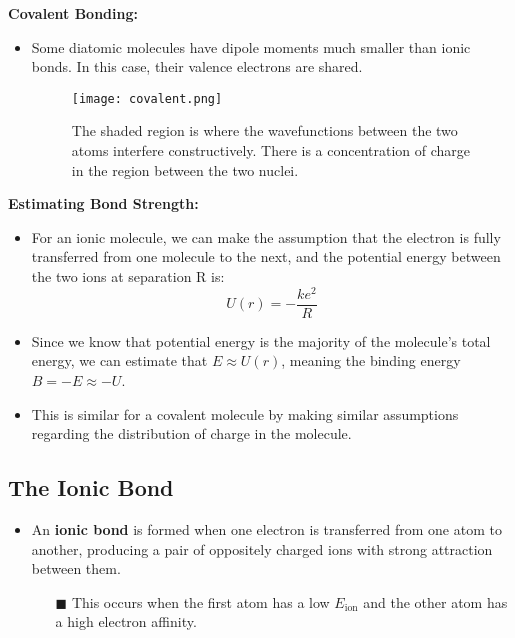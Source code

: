 \documentclass[12pt, letterpaper, twoside]{article}
\begin{document}
\textbf{Covalent Bonding:}

\begin{itemize}
    \item Some diatomic molecules have dipole moments much smaller than ionic bonds. In this case, their valence electrons are shared.
    \begin{figure}[!ht]
        \centering
        \texttt{[image: covalent.png]}
        \caption{The shaded region is where the wavefunctions between the two atoms interfere constructively. There is a concentration of charge in the region between the two nuclei.}
        \label{fig:my_label}
    \end{figure}
\end{itemize}

\textbf{Estimating Bond Strength:}

\begin{itemize}
    \item For an ionic molecule, we can make the assumption that the electron is fully transferred from one molecule to the next, and the potential energy between the two ions at separation R is:
    \begin{equation*}
        U(r) = -\frac{ke^2}{R}
    \end{equation*}
    \item Since we know that potential energy is the majority of the molecule's total energy, we can estimate that $E \approx U(r)$, meaning the binding energy $B = -E \approx -U$.
    \item This is similar for a covalent molecule by making similar assumptions regarding the distribution of charge in the molecule.
\end{itemize}
\subsection{The Ionic Bond}

\begin{itemize}
    \item An \textbf{ionic bond} is formed when one electron is transferred from one atom to another, producing a pair of oppositely charged ions with strong attraction between them.
    \begin{itemize}
        \item[$\blacksquare$] This occurs when the first atom has a low $E_{\text{ion}}$ and the other atom has a high electron affinity.
    \end{itemize}
\end{itemize}
\end{document}
